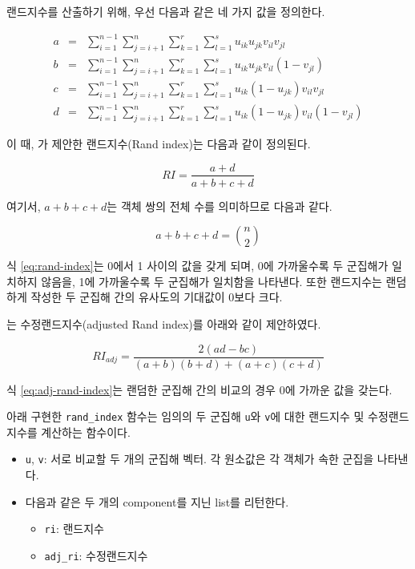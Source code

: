 \documentclass[]{book}
\providecommand{\tightlist}{%
  \setlength{\itemsep}{0pt}\setlength{\parskip}{0pt}}
\begin{document}
랜드지수를 산출하기 위해, 우선 다음과 같은 네 가지 값을 정의한다.

\begin{eqnarray*}
a &=& \sum_{i = 1}^{n - 1} \sum_{j = i + 1}^{n} \sum_{k = 1}^{r} \sum_{l = 1}^{s} u_{ik} u_{jk} v_{il} v_{jl}\\
b &=& \sum_{i = 1}^{n - 1} \sum_{j = i + 1}^{n} \sum_{k = 1}^{r} \sum_{l = 1}^{s} u_{ik} u_{jk} v_{il} (1 - v_{jl})\\
c &=& \sum_{i = 1}^{n - 1} \sum_{j = i + 1}^{n} \sum_{k = 1}^{r} \sum_{l = 1}^{s} u_{ik} (1 - u_{jk}) v_{il} v_{jl}\\
d &=& \sum_{i = 1}^{n - 1} \sum_{j = i + 1}^{n} \sum_{k = 1}^{r} \sum_{l = 1}^{s} u_{ik} (1 - u_{jk}) v_{il} (1 - v_{jl})
\end{eqnarray*}

이 때, \citet{rand1971objective} 가 제안한 랜드지수(Rand index)는 다음과 같이 정의된다.

\begin{equation}
RI = \frac{a + d}{a + b + c + d} \label{eq:rand-index}
\end{equation}

여기서, \(a + b + c + d\)는 객체 쌍의 전체 수를 의미하므로 다음과 같다.

\begin{equation*}
a + b + c + d = {n \choose 2}
\end{equation*}

식 \eqref{eq:rand-index}는 0에서 1 사이의 값을 갖게 되며, 0에 가까울수록 두 군집해가 일치하지 않음을, 1에 가까울수록 두 군집해가 일치함을 나타낸다. 또한 랜드지수는 랜덤하게 작성한 두 군집해 간의 유사도의 기대값이 0보다 크다.

\citet{hubert1985comparing} 는 수정랜드지수(adjusted Rand index)를 아래와 같이 제안하였다.

\begin{equation}
RI_{adj} = \frac{2 (ad - bc)}{(a + b)(b + d) + (a + c)(c + d)} \label{eq:adj-rand-index}
\end{equation}

식 \eqref{eq:adj-rand-index}는 랜덤한 군집해 간의 비교의 경우 0에 가까운 값을 갖는다.

아래 구현한 \texttt{rand\_index} 함수는 임의의 두 군집해 \texttt{u}와 \texttt{v}에 대한 랜드지수 및 수정랜드지수를 계산하는 함수이다.

\begin{itemize}
\tightlist
\item
  \texttt{u}, \texttt{v}: 서로 비교할 두 개의 군집해 벡터. 각 원소값은 각 객체가 속한 군집을 나타낸다.
\item
  다음과 같은 두 개의 component를 지닌 list를 리턴한다.

  \begin{itemize}
  \tightlist
  \item
    \texttt{ri}: 랜드지수
  \item
    \texttt{adj\_ri}: 수정랜드지수
  \end{itemize}
\end{itemize}
\end{document}
